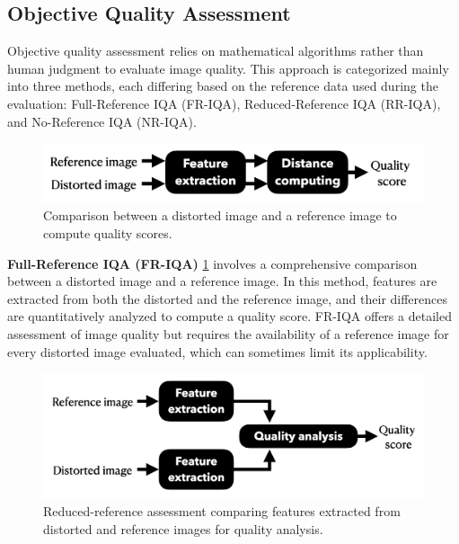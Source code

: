\subsection{Objective Quality Assessment}
\label{sub:ObjectiveQualityAssessment}
Objective quality assessment relies on mathematical algorithms rather than human judgment to evaluate image quality. This approach is categorized mainly into three methods, each differing based on the reference data used during the evaluation: Full-Reference IQA (FR-IQA), Reduced-Reference IQA (RR-IQA), and No-Reference IQA (NR-IQA). \par
\vspace{\baselineskip}
\begin{figure}[ht]
    \centering
    \includegraphics[keepaspectratio,width=15cm]{img/FRIQA.png}
    \caption{Comparison between a distorted image and a reference image to compute quality scores.}
    \label{fig:FRIQA}
\end{figure}
\textbf{Full-Reference IQA (FR-IQA)} \ref{fig:FRIQA}  involves a comprehensive comparison between a distorted image and a reference image. In this method, features are extracted from both the distorted and the reference image, and their differences are quantitatively analyzed to compute a quality score. FR-IQA offers a detailed assessment of image quality but requires the availability of a reference image for every distorted image evaluated, which can sometimes limit its applicability. \par
\vspace{\baselineskip}
\begin{figure}[ht]
    \centering
    \includegraphics[keepaspectratio,width=15cm]{img/RRIQA.png}
    \caption{Reduced-reference assessment comparing features extracted from distorted and reference images for quality analysis.}
    \label{fig:RRIQA}
\end{figure}
